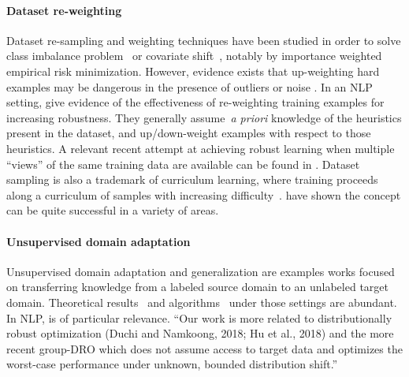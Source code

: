 \paragraph{Dataset re-weighting} Dataset re-sampling and weighting techniques have been studied in order to solve class imbalance problem~\cite{chawla2002smote} or covariate shift~\cite{sugiyama2007covariate}, notably by importance weighted empirical risk minimization. However, evidence exists that up-weighting hard examples may be dangerous in the presence of outliers or noise \cite{chapelle2007training,Kumar10,toneva2018empirical}.
In an NLP setting, \citet{clark2019dont,mahabadi2019simple} give evidence of the effectiveness of re-weighting training examples for increasing robustness. They generally assume~\emph{a priori} knowledge of the heuristics present in the dataset, and up/down-weight examples with respect to those heuristics. A relevant recent attempt at achieving robust learning when multiple ``views'' of the same training data are available can be found in .
Dataset sampling is also a trademark of curriculum learning, where training proceeds along a curriculum of samples with increasing difficulty~\citep{bengio2009curriculum}. \citet{Kumar10,lee2011learning,schaul2015prioritized,Zhao2015,Fan2017,conf/icml/KatharopoulosF18,screenerNet,jiang18mentor} have shown the concept can be quite successful in a variety of areas.

\paragraph{Unsupervised domain adaptation}
Unsupervised domain adaptation and generalization are examples works focused on transferring knowledge from a labeled source domain to an unlabeled target domain. Theoretical results~\citep{ben2010theory,mansour2012robust,conf/icml/0002CZG19} and algorithms~\citep{glorot2011domain,becker2013non,adel2017unsupervised,pei2018multi} under those settings are abundant. In NLP, \citet{jia2017adversarial} is of particular relevance.
``Our work is more related to distributionally robust optimization 
(Duchi and Namkoong, 2018; Hu et al., 2018) and the more recent group-DRO which does not assume access to target data and optimizes the worst-case performance under unknown, bounded distribution shift.''


